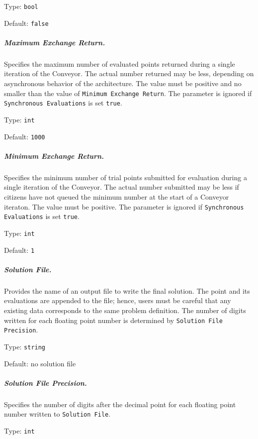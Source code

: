 \hspace{0.2in}
Type: {\tt bool}

\hspace{0.2in}
Default: {\tt false}

\subparagraph{Maximum Exchange Return.}  \label{param:MD-maxexch}
Specifies the maximum number of evaluated points returned during a single
iteration of the Conveyor.  The actual number returned may be less, depending
on asynchronous behavior of the architecture.
The value must be positive and no smaller than the value of
 {\tt Minimum Exchange Return}.
The parameter is ignored if {\tt Synchronous Evaluations} is set {\tt true}.

\hspace{0.2in}
Type: {\tt int}

\hspace{0.2in}
Default: {\tt 1000}

\subparagraph{Minimum Exchange Return.}  \label{param:MD-minexch}
Specifies the minimum number of trial points submitted for evaluation during
a single iteration of the Conveyor.  The actual number submitted may be less if
citizens have not queued the minimum number at the start of a Conveyor iteraton.
The value must be positive.
The parameter is ignored if {\tt Synchronous Evaluations} is set {\tt true}.

\hspace{0.2in}
Type: {\tt int}

\hspace{0.2in}
Default: {\tt 1}

\subparagraph{Solution File.}  \label{param:MD-solfile}
Provides the name of an output file to write the final
solution.  The point and its evaluations are appended to the file; hence,
users must be careful that any existing data corresponds to the same
problem definition.
The number of digits written for each floating point number is determined by
{\tt Solution File Precision}.

\hspace{0.2in}
Type: {\tt string}

\hspace{0.2in}
Default: no solution file

\subparagraph{Solution File Precision.}  \label{param:MD-solfileprec}
Specifies the number of digits after the decimal point for each
floating point number written to {\tt Solution File}.

\hspace{0.2in}
Type: {\tt int}

